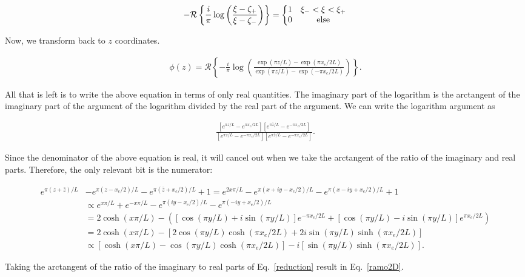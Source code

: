 \documentclass[12pt]{article}
\begin{document}
\begin{align}
-\mathcal{R}\left\{\frac{i}{\pi}\log\left(\frac{\xi-\zeta_+}{\xi-\zeta_-}\right)\right\}=\left\{\begin{matrix}1 & \xi_-<\xi<\xi_+ \cr 0 &\text{else}\end{matrix}\right.
\end{align}

\noindent Now, we transform back to $z$ coordinates.  

\begin{align}
\phi(z)=\mathcal{R}\left\{-\frac{i}{\pi}\log\left(\frac{\exp(\pi z/L)-\exp(\pi x_e/2L)}{\exp(\pi z/L)-\exp(-\pi x_e/2L)}\right)\right\}.
\end{align}

All that is left is to write the above equation in terms of only real quantities.  The imaginary part of the logarithm is the arctangent of the imaginary part of the argument of the logarithm divided by the real part of the argument.  We can write the logarithm argument as

\begin{align}
\frac{\left[e^{\pi z/L}-e^{\pi x_e/2L}\right]\left[e^{\pi \bar{z}/L}-e^{-\pi x_e/2L}\right]}{\left[e^{\pi z/L}-e^{-\pi x_e/2L}\right]\left[e^{\pi \bar{z}/L}-e^{-\pi x_e/2L}\right]}.
\end{align}

\noindent Since the denominator of the above equation is real, it will cancel out when we take the arctangent of the ratio of the imaginary and real parts.  Therefore, the only relevant bit is the numerator:

\begin{align}\nonumber
\label{reduction}
e^{\pi (z+\bar{z})/L}&-e^{\pi (z-x_e/2)/L}-e^{\pi (\bar{z}+x_e/2)/L}+1=e^{2x\pi /L}-e^{\pi (x+iy-x_e/2)/L}-e^{\pi (x-iy+x_e/2)/L}+1\\\nonumber
&\propto e^{x\pi /L}+e^{-x\pi /L}-e^{\pi (iy-x_e/2)/L}-e^{\pi (-iy+x_e/2)/L}\\\nonumber
&= 2\cosh(x\pi/L)-\left([\cos(\pi y/L)+i\sin(\pi y/L)]e^{-\pi x_e/2L}+[\cos(\pi y/L)-i\sin(\pi y/L)]e^{\pi x_e/2L}\right)\\\nonumber
&= 2\cosh(x\pi/L)-\left[2\cos(\pi y/L)\cosh(\pi x_e/2L)+2i\sin(\pi y/L)\sinh(\pi x_e/2L)\right]\\
&\propto \left[\cosh(x\pi/L)-\cos(\pi y/L)\cosh(\pi x_e/2L)\right]- i\left[\sin(\pi y/L)\sinh(\pi x_e/2L)\right].
\end{align}

\noindent Taking the arctangent of the ratio of the imaginary to real parts of Eq.~\ref{reduction} result in Eq.~\ref{ramo2D}.  
\end{document}
